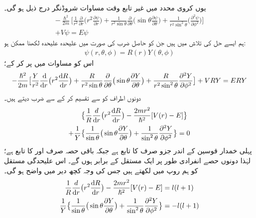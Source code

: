 یوں کروی محدد میں غیر تابع وقت مساوات شروڈنگر درج ذیل ہو گی۔ 
\begin{multline}\label{مساوات_ابعادی_لاپلاسی_ب}
-\frac{\hslash^{2}}{2m}\big [\frac{1}{r^{2}}\frac{\partial}{\partial{r}}\big (r^{2}\frac{\partial\psi}{\partial{r}}\big )+\frac{1}{r^{2}\sin{\theta}}\frac{\partial}{\partial{\theta}}\big(\sin{\theta}\frac{\partial\psi}{\partial{\theta}}\big )+\frac{1}{r^{2}\sin^{2}{\theta}}\big(\frac{\partial^{2}\psi}{\partial{\phi^{2}}}\big )\big ]\\
+V\psi=E\psi 
\end{multline}
ہم ایسے حل کی تلاش میں ہیں جن کو حاصل ضرب کی صورت میں علیحدہ علیحدہ لکھنا ممکن ہو:
\begin{align}
\psi(r,\theta,\phi)=R(r)Y(\theta,\phi) 
\end{align}
اس کو مساوات  میں پر کر کے؛
\begin{multline*}
-\frac{\hslash^{2}}{2m}\big [\frac{Y}{r^{2}}\frac{\dif}{\dif{r}}\big (r^{2}\frac{\dif{R}}{\dif{r}}\big )+\frac{R}{r^{2}\sin{\theta}}\frac{\partial}{\partial{\theta}}\big(\sin{\theta}\frac{\partial{Y}}{\partial{\theta}}\big )+\frac{R}{r^{2}\sin^{2}{\theta}}\frac{\partial^{2}{Y}}{\partial{\phi^{2}}}\big ]+VRY=ERY 
\end{multline*}
دونوں اطراف کو  سے تقسیم کر کے   سے ضرب دیتے ہیں۔
\begin{align*}
&\big\{\frac{1}{R}\frac{d}{\dif{r}}\big(r^{2}\frac{\dif{R}}{\dif{r}}\big)-\frac{2mr^{2}}{\hslash^{2}}[V(r)-E]\big\} \\
+\frac{1}{Y}&\big\{\frac{1}{\sin{\theta}}\big(\sin{\theta}\frac{\partial{Y}}{\partial{\theta}}\big)+\frac{1}{\sin^{2}{\theta}}\frac{\partial^{2}{Y}}{\partial{\phi^{2}}}\big\}=0 
\end{align*}
پہلی خمدار قوسین کے اندر جزو صرف  کا تابع ہے جبکہ باقی حصہ صرف     اور      کا تابع ہے؛  لہٰذا دونوں حصے انفرادی طور پر ایک مستقل کے برابر ہوں گے۔ اس علیحدگی مستقل کو ہم   روپ میں لکھتے ہیں جس کی وجہ کچھ دیر میں واضح ہو گی۔
\begin{align}
\frac{1}{R}\frac{d}{\dif{r}}\big(r^{2}\frac{\dif{R}}{\dif{r}}\big)-\frac{2mr^{2}}{\hslash^{2}}[V(r)-E]&=l(l+1)\label{مساوات_ابعاد_رداسی_الف} \\ 
\frac{1}{Y}\big\{\frac{1}{\sin{\theta}}\big(\sin{\theta}\frac{\partial{Y}}{\partial{\theta}}\big)+\frac{1}{\sin^{2}{\theta}}\frac{\partial^{2}{Y}}{\partial{\phi^{2}}}\big\}&=-l(l+1) \label{مساوات_ابعاد_غیر_رداسی_الف}
\end{align}
